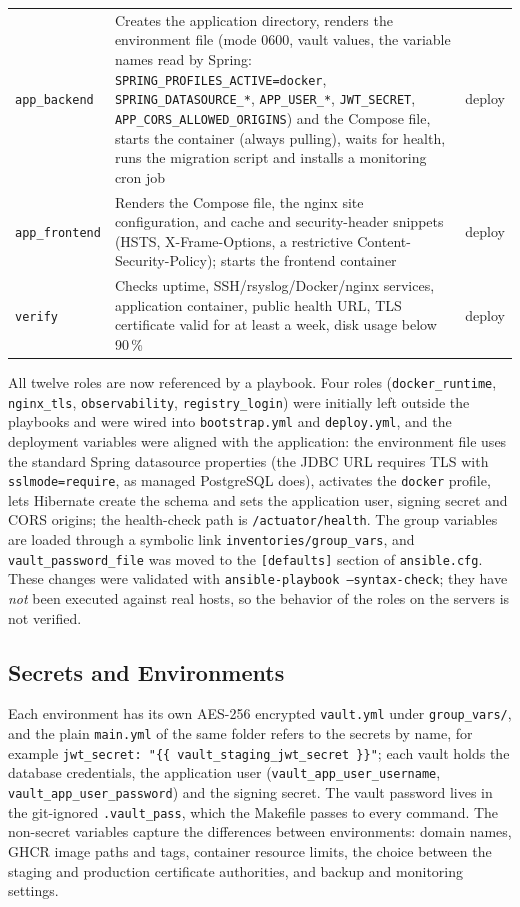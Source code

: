 \begin{table}[htbp]
\begin{tabularx}{\linewidth}{@{}l X l@{}}
\texttt{app\_backend} & Creates the application directory, renders the environment file (mode 0600, vault values, the variable names read by Spring: \texttt{SPRING\_PROFILES\_ACTIVE=docker}, \texttt{SPRING\_DATASOURCE\_*}, \texttt{APP\_USER\_*}, \texttt{JWT\_SECRET}, \texttt{APP\_CORS\_ALLOWED\_ORIGINS}) and the Compose file, starts the container (always pulling), waits for health, runs the migration script and installs a monitoring cron job & deploy \\
\texttt{app\_frontend} & Renders the Compose file, the nginx site configuration, and cache and security-header snippets (HSTS, X-Frame-Options, a restrictive Content-Security-Policy); starts the frontend container & deploy \\
\texttt{verify} & Checks uptime, SSH/rsyslog/Docker/nginx services, application container, public health URL, TLS certificate valid for at least a week, disk usage below 90\,\% & deploy \\
\bottomrule
\end{tabularx}
\end{table}

All twelve roles are now referenced by a playbook. Four roles (\texttt{docker\_runtime}, \texttt{nginx\_tls}, \texttt{observability}, \texttt{registry\_login}) were initially left outside the playbooks and were wired into \texttt{bootstrap.yml} and \texttt{deploy.yml}, and the deployment variables were aligned with the application: the environment file uses the standard Spring datasource properties (the JDBC URL requires TLS with \texttt{sslmode=require}, as managed PostgreSQL does), activates the \texttt{docker} profile, lets Hibernate create the schema and sets the application user, signing secret and CORS origins; the health-check path is \texttt{/actuator/health}. The group variables are loaded through a symbolic link \texttt{inventories/group\_vars}, and \texttt{vault\_password\_file} was moved to the \texttt{[defaults]} section of \texttt{ansible.cfg}. These changes were validated with \texttt{ansible-playbook --syntax-check}; they have \emph{not} been executed against real hosts, so the behavior of the roles on the servers is not verified.

\subsection{Secrets and Environments}

Each environment has its own AES-256 encrypted \texttt{vault.yml} under \texttt{group\_vars/}, and the plain \texttt{main.yml} of the same folder refers to the secrets by name, for example \texttt{jwt\_secret: "\{\{ vault\_staging\_jwt\_secret \}\}"}; each vault holds the database credentials, the application user (\texttt{vault\_app\_user\_username}, \texttt{vault\_app\_user\_password}) and the signing secret. The vault password lives in the git-ignored \texttt{.vault\_pass}, which the Makefile passes to every command. The non-secret variables capture the differences between environments: domain names, GHCR image paths and tags, container resource limits, the choice between the staging and production certificate authorities, and backup and monitoring settings.

